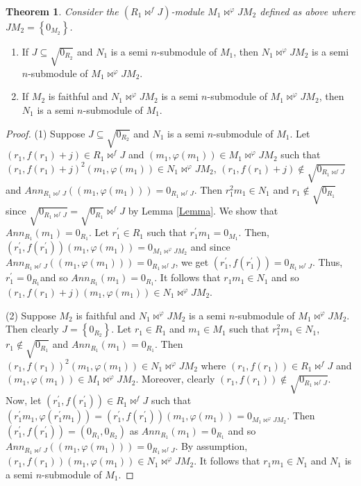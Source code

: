 \documentclass{amsart}%
\newtheorem{theorem}{Theorem}
\theoremstyle{plain}
\numberwithin{equation}{section}
\begin{document}
\begin{theorem}
Consider the $(R_{1}\Join^{f}J)$-module $M_{1}\Join^{\varphi}JM_{2}$ defined
as above where $JM_{2}=\left\{  0_{M_{2}}\right\}  $.
\end{theorem}

\begin{enumerate}
\item If $J\subseteq\sqrt{0_{R_{2}}}$ and $N_{1}$ is a semi $n$-submodule of
$M_{1}$, then $N_{1}\Join^{\varphi}JM_{2}$ is a semi $n$-submodule of
$M_{1}\Join^{\varphi}JM_{2}$.

\item If $M_{2}$ is faithful and $N_{1}\Join^{\varphi}JM_{2}$ is a semi
$n$-submodule of $M_{1}\Join^{\varphi}JM_{2}$, then $N_{1}$ is a semi
$n$-submodule of $M_{1}$.
\end{enumerate}

\begin{proof}
(1) Suppose $J\subseteq\sqrt{0_{R_{2}}}$ and $N_{1}$ is a semi $n$-submodule
of $M_{1}$. Let $(r_{1},f(r_{1})+j)\in R_{1}\Join^{f}J$ and $(m_{1}%
,\varphi(m_{1}))\in M_{1}\Join^{\varphi}JM_{2}$ such that $(r_{1}%
,f(r_{1})+j)^{2}(m_{1},\varphi(m_{1}))\in N_{1}\Join^{\varphi}JM_{2}$,
$(r_{1},f(r_{1})+j)\notin\sqrt{0_{R_{1}\Join^{f}J}}$ and $Ann_{R_{1}\Join
^{f}J}((m_{1},\varphi(m_{1})))=0_{R_{1}\Join^{f}J}$. Then $r_{1}^{2}m_{1}\in
N_{1}$ and $r_{1}\notin\sqrt{0_{R_{1}}}$ since $\sqrt{0_{R_{1}\Join^{f}J}%
}=\sqrt{0_{R_{1}}}\Join^{f}J$ by Lemma \ref{Lemma}. We show that $Ann_{R_{1}%
}(m_{1})=0_{R_{1}}$. Let $r_{1}^{\prime}\in R_{1}$ such that $r_{1}^{\prime
}m_{1}=0_{M_{1}}.$ Then, $(r_{1}^{\prime},f(r_{1}^{\prime}))(m_{1}%
,\varphi(m_{1}))=0_{M_{1}\Join^{\varphi}JM_{2}}$ and since $Ann_{R_{1}%
\Join^{f}J}((m_{1},\varphi(m_{1})))=0_{R_{1}\Join^{f}J}$, we get
$(r_{1}^{\prime},f(r_{1}^{\prime}))=0_{R_{1}\Join^{f}J}$. Thus, $r_{1}%
^{\prime}=0_{R_{1}}$and so $Ann_{R_{1}}(m_{1})=0_{R_{1}}$. It follows that
$r_{1}m_{1}\in N_{1}$ and so $(r_{1},f(r_{1})+j)(m_{1},\varphi(m_{1}))\in
N_{1}\Join^{\varphi}JM_{2}$.

(2) Suppose $M_{2}$ is faithful and $N_{1}\Join^{\varphi}JM_{2}$ is a semi
$n$-submodule of $M_{1}\Join^{\varphi}JM_{2}$. Then clearly $J=\left\{
0_{R_{2}}\right\}  $. Let $r_{1}\in R_{1}$ and $m_{1}\in M_{1}$ such that
$r_{1}^{2}m_{1}\in N_{1}$, $r_{1}\notin\sqrt{0_{R_{1}}}$ and $Ann_{R_{1}%
}(m_{1})=0_{R_{1}}$. Then $(r_{1},f(r_{1}))^{2}(m_{1},\varphi(m_{1}))\in
N_{1}\Join^{\varphi}JM_{2}$ where $(r_{1},f(r_{1}))\in R_{1}\Join^{f}J$ and
$(m_{1},\varphi(m_{1}))\in M_{1}\Join^{\varphi}JM_{2}$. Moreover, clearly
$(r_{1},f(r_{1}))\notin\sqrt{0_{R_{1}\Join^{f}J}}$. Now, let $(r_{1}^{\prime
},f(r_{1}^{\prime}))\in R_{1}\Join^{f}J$ such that $(r_{1}^{\prime}%
m_{1},\varphi(r_{1}^{\prime}m_{1}))=(r_{1}^{\prime},f(r_{1}^{\prime}%
))(m_{1},\varphi(m_{1}))=0_{M_{1}\Join^{\varphi}JM_{2}}$. Then $(r_{1}%
^{\prime},f(r_{1}^{\prime}))=(0_{R_{1}},0_{R_{2}})$ as $Ann_{R_{1}}%
(m_{1})=0_{R_{1}}$ and so $Ann_{R_{1}\Join^{f}J}((m_{1},\varphi(m_{1}%
)))=0_{R_{1}\Join^{f}J}$. By assumption, $(r_{1},f(r_{1}))(m_{1},\varphi
(m_{1}))\in N_{1}\Join^{\varphi}JM_{2}$. It follows that $r_{1}m_{1}\in N_{1}$
and $N_{1}$ is a semi $n$-submodule of $M_{1}$.
\end{proof}
\end{document}
